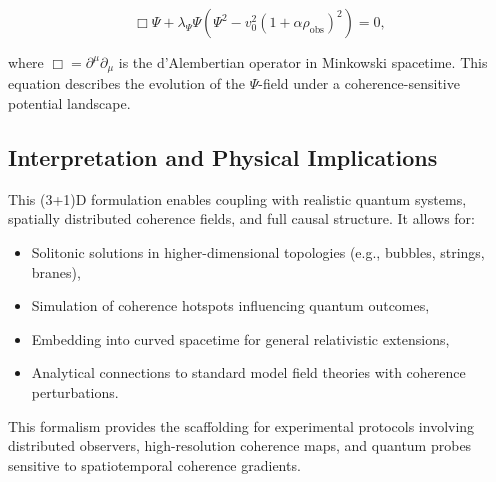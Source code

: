 \documentclass{report}
\begin{document}
\begin{equation}
\Box \Psi + \lambda_\Psi \Psi\left(\Psi^2 - v_0^2(1 + \alpha \rho_{\text{obs}})^2\right) = 0,
\end{equation}

where $\Box = \partial^\mu \partial_\mu$ is the d'Alembertian operator in Minkowski spacetime. This equation describes the evolution of the $\Psi$-field under a coherence-sensitive potential landscape.

\subsection{Interpretation and Physical Implications}

This (3+1)D formulation enables coupling with realistic quantum systems, spatially distributed coherence fields, and full causal structure. It allows for:
\begin{itemize}
  \item Solitonic solutions in higher-dimensional topologies (e.g., bubbles, strings, branes),
  \item Simulation of coherence hotspots influencing quantum outcomes,
  \item Embedding into curved spacetime for general relativistic extensions,
  \item Analytical connections to standard model field theories with coherence perturbations.
\end{itemize}

This formalism provides the scaffolding for experimental protocols involving distributed observers, high-resolution coherence maps, and quantum probes sensitive to spatiotemporal coherence gradients.
\end{document}
